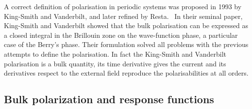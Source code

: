 A correct definition of polarisation in periodic systems was proposed in 1993 by  King-Smith and Vanderbilt,\cite{KSV1} and later refined by Resta.~\cite{PhysRevLett.80.1800,RevModPhys.66.899}
%
%
In their seminal paper, King-Smith and Vanderbilt showed that the bulk polarisation can be expressed as a closed integral in the Brillouin zone on the wave-function phase, a particular case of the Berry's phase. Their formulation solved all problems with the previous attempts to define the polarisation. In fact the King-Smith and Vanderbilt polarisation is a bulk quantity, its time derivative gives the current and its derivatives respect to the external field reproduce the polarisabilities at all orders.


\subsection{Bulk polarization and response functions}



